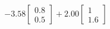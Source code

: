 \documentclass[preview]{standalone}
\begin{document}
\begin{align*}
-3.58 \begin{bmatrix} 0.8 \\ 0.5 \end{bmatrix} + 2.00 \begin{bmatrix} 1 \\ 1.6 \end{bmatrix}
\end{align*}
\end{document}
